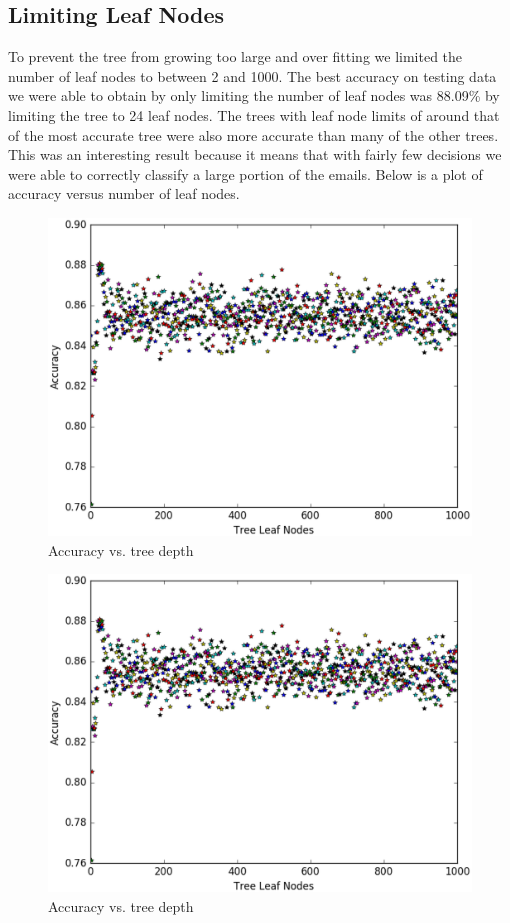 \documentclass{article} %
\begin{document}
\subsection{Limiting Leaf Nodes}
To prevent the tree from growing too large and over fitting we limited the number
of leaf nodes to between 2 and 1000. The best accuracy on testing data we were
able to obtain by only limiting the number of leaf nodes was 88.09\% by limiting
the tree to 24 leaf nodes. The trees with leaf node limits of around that of
the most accurate tree were also more accurate than many of the other trees.
This was an interesting result because it means that with fairly few decisions
we were able to correctly classify a large portion of the emails. Below is a
plot of accuracy versus number of leaf nodes.
\begin{figure}[H]
\includegraphics[scale=.5]{accuracy-vs-nodes}
\caption{Accuracy vs. tree depth}
\end{figure}

\begin{figure}[H]
\includegraphics[scale=.5]{accuracy-vs-nodes}
\caption{Accuracy vs. tree depth}
\end{figure}
\end{document}
